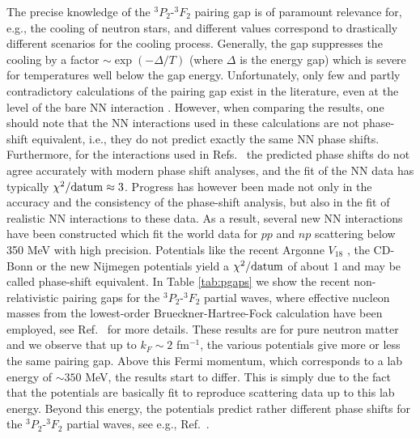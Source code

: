 The precise knowledge of the $^3P_2$-$^3F_2$ pairing gap is of 
paramount relevance for, e.g.,  the cooling of neutron stars, 
and different values correspond to drastically
different scenarios for the cooling process.
Generally, the gap suppresses the cooling by a factor
$\sim\exp(-\Delta/T)$ (where $\Delta$ is the energy gap)
which is severe for
temperatures well below the gap energy.
Unfortunately, only few and partly
contradictory calculations of the pairing gap exist in the literature, 
even at the level of the bare NN interaction 
\cite{amu85,bcll92,taka93,elga96,khodel97}. 
However, when comparing the results, one should note that the  
NN interactions used in these calculations are not phase-shift 
equivalent, i.e.,  they do not 
predict exactly the same NN phase shifts.  
Furthermore, for the interactions used in 
Refs.~\cite{amu85,bcll92,taka93,elga96} the predicted 
phase shifts do not agree accurately with modern phase shift 
analyses, and the fit of the NN data has typically 
$\chi^2/{\rm datum}\approx 3$.  
Progress has 
however been made not only in the accuracy and the consistency of the 
phase-shift analysis, but also in the fit of realistic NN interactions 
to these data.  As a result, several new NN interactions have 
been constructed which fit the world data for $pp$ and $np$ scattering 
below 350 MeV with high precision.  Potentials like the recent 
Argonne $V_{18}$ \cite{v18}, the CD-Bonn \cite{cdbonn} 
or the new Nijmegen potentials \cite{nim} yield a 
$\chi^2/{\rm datum}$ of about 1 and may be called phase-shift 
equivalent.  
In Table \ref{tab:pgaps} we show the recent non-relativistic
pairing gaps for the $^3P_2$-$^3F_2$ partial waves, where
effective nucleon masses from the  lowest-order Brueckner-Hartree-Fock
calculation have been 
employed, see Ref.\ \cite{beehs98} for more details.
These results are for pure neutron matter and we observe that
up to $k_F\sim 2$ fm$^{-1}$, the various potentials
give more
or less the same pairing gap. Above this Fermi momentum, which
corresponds to a lab energy of $\sim 350$ MeV, the results start
to differ. This is simply due to the fact that the potentials
are basically fit to reproduce scattering data up to this
lab energy. Beyond this energy, the potentials predict rather
different phase shifts for the 
$^3P_2$-$^3F_2$ partial waves, see e.g.,  Ref.\ \cite{beehs98}.
